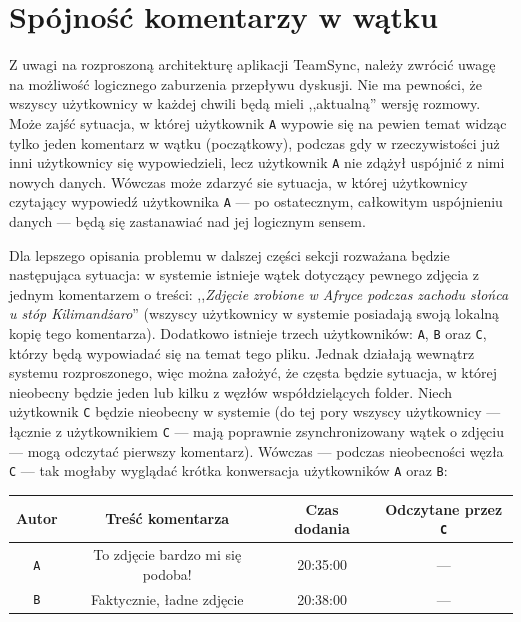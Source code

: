 \documentclass[polish,a4paper,twoside]{ppfcmthesis}
\begin{document}
\section{Spójność komentarzy w wątku}

\label{consistencies}

Z uwagi na rozproszoną architekturę aplikacji TeamSync, należy zwrócić uwagę na możliwość logicznego zaburzenia przepływu dyskusji. Nie ma pewności, że wszyscy użytkownicy w każdej chwili będą mieli ,,aktualną'' wersję rozmowy. Może zajść sytuacja, w której użytkownik \texttt{A} wypowie się na pewien temat widząc tylko jeden komentarz w wątku (początkowy), podczas gdy w rzeczywistości już inni użytkownicy się wypowiedzieli, lecz użytkownik \texttt{A} nie zdążył uspójnić z nimi nowych danych. Wówczas może zdarzyć sie sytuacja, w której użytkownicy czytający wypowiedź użytkownika \texttt{A} --- po ostatecznym, całkowitym uspójnieniu danych --- będą się zastanawiać nad jej logicznym sensem.

Dla lepszego opisania problemu w dalszej części sekcji rozważana będzie następująca sytuacja: w systemie istnieje wątek dotyczący pewnego zdjęcia z jednym komentarzem o treści: ,,\textit{Zdjęcie zrobione w Afryce podczas zachodu słońca u stóp Kilimandżaro}'' (wszyscy użytkownicy w systemie posiadają swoją lokalną kopię tego komentarza). Dodatkowo istnieje trzech użytkowników: \texttt{A}, \texttt{B} oraz \texttt{C}, którzy będą wypowiadać się na temat tego pliku. Jednak działają wewnątrz systemu rozproszonego, więc można założyć, że częsta będzie sytuacja, w której nieobecny będzie jeden lub kilku z węzłów współdzielących folder. Niech użytkownik \texttt{C} będzie nieobecny w systemie (do tej pory wszyscy użytkownicy --- łącznie z użytkownikiem \texttt{C} --- mają poprawnie zsynchronizowany wątek o zdjęciu --- mogą odczytać pierwszy komentarz). Wówczas --- podczas nieobecności węzła \texttt{C} --- tak mogłaby wyglądać krótka konwersacja użytkowników \texttt{A} oraz \texttt{B}:

\vspace{5px}
\begin{center}
\begin{tabular}{c | c | c | c}
 \textbf{Autor} & \textbf{Treść komentarza} & \textbf{Czas dodania} & \textbf{Odczytane przez \texttt{C}}\\
 \hline
 \texttt{A} & To zdjęcie bardzo mi się podoba! & 20:35:00 & --- \\
 \texttt{B} & Faktycznie, ładne zdjęcie & 20:38:00 & ---
\end{tabular}
\end{center}
\vspace{5px}
\end{document}
